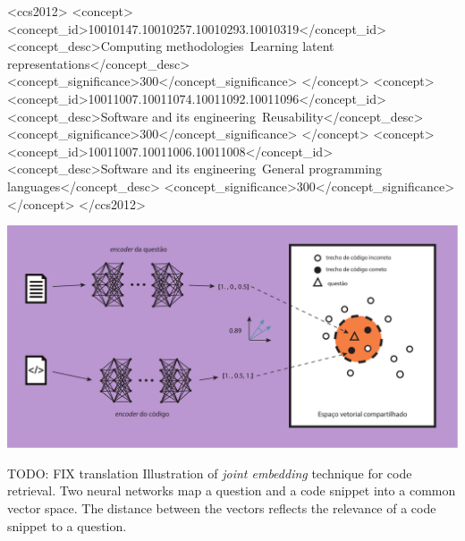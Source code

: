 \documentclass[sigconf]{acmart}
\begin{document}
\begin{CCSXML}
<ccs2012>
   <concept>
       <concept_id>10010147.10010257.10010293.10010319</concept_id>
       <concept_desc>Computing methodologies~Learning latent representations</concept_desc>
       <concept_significance>300</concept_significance>
       </concept>
   <concept>
       <concept_id>10011007.10011074.10011092.10011096</concept_id>
       <concept_desc>Software and its engineering~Reusability</concept_desc>
       <concept_significance>300</concept_significance>
       </concept>
   <concept>
       <concept_id>10011007.10011006.10011008</concept_id>
       <concept_desc>Software and its engineering~General programming languages</concept_desc>
       <concept_significance>300</concept_significance>
       </concept>
 </ccs2012>
\end{CCSXML}




\begin{teaserfigure}
  \includegraphics[width=\textwidth]{figuras/joint_embedding.pdf}
  \caption{TODO: FIX translation Illustration of \emph{joint embedding} technique for code retrieval. Two neural networks map a question and a code snippet into a common vector space. The distance between the vectors reflects the relevance of a code snippet to a question.}
  \label{fig:joint-embedding}
\end{teaserfigure}
\end{document}
